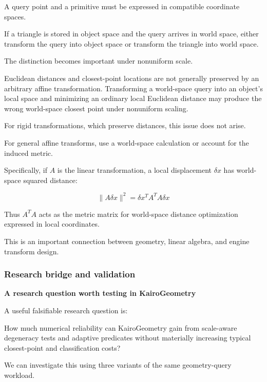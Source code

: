 A query point and a primitive must be expressed in compatible coordinate spaces.

If a triangle is stored in object space and the query arrives in world space, either transform the query into object space or transform the triangle into world space.

The distinction becomes important under nonuniform scale.

Euclidean distances and closest-point locations are not generally preserved by an arbitrary affine transformation. Transforming a world-space query into an object's local space and minimizing an ordinary local Euclidean distance may produce the wrong world-space closest point under nonuniform scaling.

For rigid transformations, which preserve distances, this issue does not arise.

For general affine transforms, use a world-space calculation or account for the induced metric.

Specifically, if \(A\) is the linear transformation, a local displacement \(\delta x\) has world-space squared distance:

\[
\|\!A\delta x\!\|^2 = \delta x^T A^T A\delta x
\]

Thus \(A^TA\) acts as the metric matrix for world-space distance optimization expressed in local coordinates.

This is an important connection between geometry, linear algebra, and engine transform design.

\subsubsection{Research bridge and validation}\label{research-bridge-and-validation}

\textbf{A research question worth testing in KairoGeometry}

A useful falsifiable research question is:

How much numerical reliability can KairoGeometry gain from scale-aware degeneracy tests and adaptive predicates without materially increasing typical closest-point and classification costs?

We can investigate this using three variants of the same geometry-query workload.

